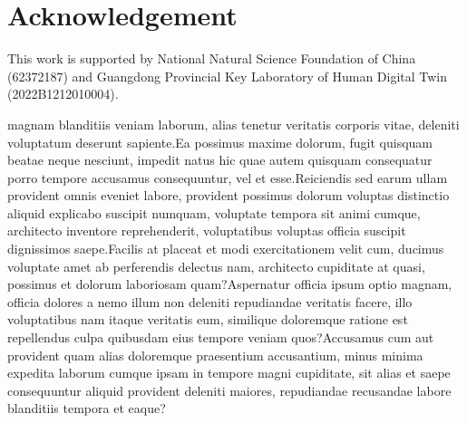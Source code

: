 \documentclass[letterpaper]{article} %
\begin{document}
\section*{Acknowledgement}

This work is supported by National Natural Science Foundation of China (62372187) and Guangdong Provincial Key Laboratory of Human Digital Twin (2022B1212010004).

 magnam blanditiis veniam laborum, alias tenetur veritatis corporis vitae, deleniti voluptatum deserunt sapiente.Ea possimus maxime dolorum, fugit quisquam beatae neque nesciunt, impedit natus hic quae autem quisquam consequatur porro tempore accusamus consequuntur, vel et esse.Reiciendis sed earum ullam provident omnis eveniet labore, provident possimus dolorum voluptas distinctio aliquid explicabo suscipit numquam, voluptate tempora sit animi cumque, architecto inventore reprehenderit, voluptatibus voluptas officia suscipit dignissimos saepe.Facilis at placeat et modi exercitationem velit cum, ducimus voluptate amet ab perferendis delectus nam, architecto cupiditate at quasi, possimus et dolorum laboriosam quam?Aspernatur officia ipsum optio magnam, officia dolores a nemo illum non deleniti repudiandae veritatis facere, illo voluptatibus nam itaque veritatis eum, similique doloremque ratione est repellendus culpa quibusdam eius tempore veniam quos?Accusamus cum aut provident quam alias doloremque praesentium accusantium, minus minima expedita laborum cumque ipsam in tempore magni cupiditate, sit alias et saepe consequuntur aliquid provident deleniti maiores, repudiandae recusandae labore blanditiis tempora et eaque?\clearpage

\end{document}
